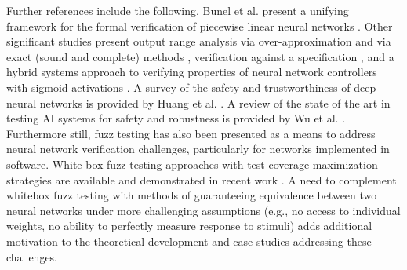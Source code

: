 Further references include the following.  Bunel et al. present a unifying
framework for the formal verification of piecewise linear
neural networks \cite{bunel_unified_2018}. Other significant studies
present output range analysis via
over-approximation \cite{gehr_ai2:_2018}\cite{huang_divide_2020}
and via exact (sound and complete) methods \cite{tran_nnv:_2020}
\cite{tran_parallelizable_2019}, verification against a
specification \cite{yaghoubi_worst-case_2020}, and a hybrid
systems approach to verifying properties of neural
network controllers with sigmoid activations \cite{ivanov_verisig:_2019}.
A survey of the safety and trustworthiness of deep neural
networks is provided by Huang et al. \cite{huang_survey_2020}.
A review of the state of the art in testing AI systems for safety
and robustness is provided by Wu et al. \cite{wu_testing_2020}.
Furthermore still, fuzz testing has also been presented as a means to address neural network verification challenges, particularly for networks implemented in software.  White-box fuzz testing approaches with test coverage maximization strategies are available and demonstrated in recent work \cite{pei_deepxplore_2017,guo_dlfuzz_2018,odena_tensorfuzz_2019,liang_deepfuzzer_2019}.  A need to complement whitebox fuzz testing with methods of guaranteeing equivalence between two neural networks under more challenging assumptions (e.g., no access to individual weights, no ability to perfectly measure response to stimuli) adds additional motivation to the theoretical development and case studies addressing these challenges.

